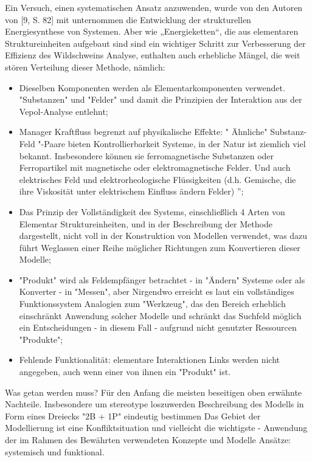 \documentclass[11pt,a4paper]{article}
\begin{document}
Ein Versuch, einen systematischen Ansatz anzuwenden, wurde von den Autoren von
[9, S. 82] mit unternommen die Entwicklung der strukturellen Energiesynthese
von Systemen. Aber wie „Energieketten“, die aus elementaren Struktureinheiten
aufgebaut sind sind ein wichtiger Schritt zur Verbesserung der Effizienz des
Wildschweins Analyse, enthalten auch erhebliche Mängel, die weit stören
Verteilung dieser Methode, nämlich:
\begin{itemize}
\item Dieselben Komponenten werden als Elementarkomponenten verwendet.
"Substanzen" und "Felder" und damit die Prinzipien der Interaktion
aus der Vepol-Analyse entlehnt;
\item Manager Kraftfluss begrenzt auf physikalische Effekte: " Ähnliche"
Substanz-Feld "-Paare bieten Kontrollierbarkeit Systeme, in der Natur ist
ziemlich viel bekannt. Insbesondere können sie ferromagnetische Substanzen
oder Ferropartikel mit magnetische oder elektromagnetische Felder. Und auch
elektrisches Feld und elektrorheologische Flüssigkeiten (d.h.  Gemische, die
ihre Viskosität unter elektrischem Einfluss ändern Felder) ”;
\item Das Prinzip der Vollständigkeit des Systems, einschließlich 4 Arten von
  Elementar Struktureinheiten, und in der Beschreibung der Methode
  dargestellt, nicht voll in der Konstruktion von Modellen verwendet, was dazu
  führt Weglassen einer Reihe möglicher Richtungen zum Konvertieren dieser
  Modelle;
\item "Produkt" wird als Feldempfänger betrachtet - in "Ändern" Systeme oder
  als Konverter - in "Messen", aber Nirgendwo erreicht es laut ein
  vollständiges Funktionssystem Analogien zum "Werkzeug", das den Bereich
  erheblich einschränkt Anwendung solcher Modelle und schränkt das Suchfeld
  möglich ein Entscheidungen - in diesem Fall - aufgrund nicht genutzter
  Ressourcen "Produkte";
\item Fehlende Funktionalität: elementare Interaktionen
  Links werden nicht angegeben, auch wenn einer von ihnen ein "Produkt" ist.
\end{itemize}
Was getan werden muss? Für den Anfang die meisten beseitigen oben erwähnte
Nachteile. Insbesondere um stereotype loszuwerden Beschreibung des Modells in
Form eines Dreiecks "2B + 1P" eindeutig bestimmen Das Gebiet der Modellierung
ist eine Konfliktsituation und vielleicht die wichtigste - Anwendung der im
Rahmen des Bewährten verwendeten Konzepte und Modelle Ansätze: systemisch und
funktional.
\end{document}
